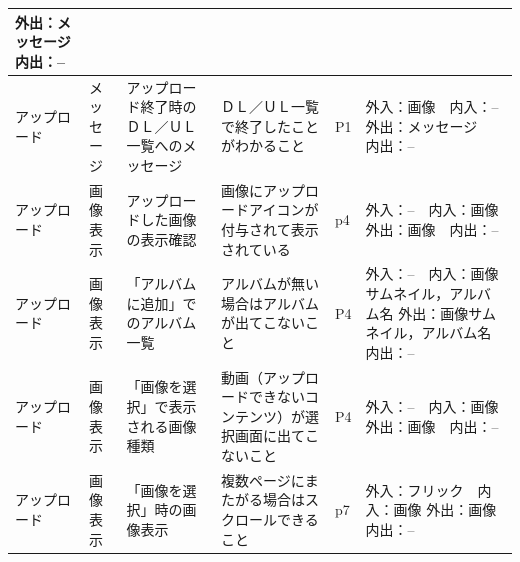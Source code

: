 \begin{table}[htbp]
\begin{tabular}{|p{8em}|p{7em}|p{9em}|p{9em}|p{3em}|p{12em}|}
外出：メッセージ　内出：-- \bigstrut\\
    \hline
    アップロード & メッセージ & アップロード終了時のＤＬ／ＵＬ一覧へのメッセージ & ＤＬ／ＵＬ一覧で終了したことがわかること & P1    & 外入：画像　内入：--
外出：メッセージ　内出：-- \bigstrut\\
    \hline
    アップロード & 画像表示  & アップロードした画像の表示確認 & 画像にアップロードアイコンが付与されて表示されている & p4    & 外入：--　内入：画像
外出：画像　内出：-- \bigstrut\\
    \hline
    アップロード & 画像表示  & 「アルバムに追加」でのアルバム一覧 & アルバムが無い場合はアルバムが出てこないこと & P4    & 外入：--　内入：画像サムネイル，アルバム名
外出：画像サムネイル，アルバム名　内出：-- \bigstrut\\
    \hline
    アップロード & 画像表示  & 「画像を選択」で表示される画像種類 & 動画（アップロードできないコンテンツ）が選択画面に出てこないこと & P4    & 外入：--　内入：画像
外出：画像　内出：-- \bigstrut\\
    \hline
    アップロード & 画像表示  & 「画像を選択」時の画像表示 & 複数ページにまたがる場合はスクロールできること & p7    & 外入：フリック　内入：画像
外出：画像　内出：-- \bigstrut\\
    \hline
    \end{tabular}%
  \label{tab:D-4-ER2-1}%
\end{table}%


